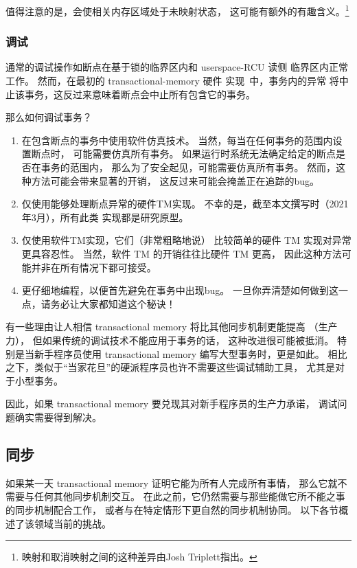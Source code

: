 值得注意的是，会使相关内存区域处于未映射状态，
这可能有额外的有趣含义。\footnote{
	映射和取消映射之间的这种差异由Josh Triplett指出。}

\subsubsection{调试}
\label{sec:future:Debugging}

通常的调试操作如断点在基于锁的临界区内和 userspace-RCU 读侧
临界区内正常工作。
然而，在最初的 transactional-memory 硬件
实现~\cite{DaveDice2009ASPLOSRockHTM}中，事务内的异常
将中止该事务，这反过来意味着断点会中止所有包含它的事务。

那么如何调试事务？

\begin{enumerate}
\item	在包含断点的事务中使用软件仿真技术。
	当然，每当在任何事务的范围内设置断点时，
	可能需要仿真所有事务。
	如果运行时系统无法确定给定的断点是否在事务的范围内，
	那么为了安全起见，可能需要仿真所有事务。
	然而，这种方法可能会带来显著的开销，
	这反过来可能会掩盖正在追踪的bug。
\item	仅使用能够处理断点异常的硬件TM实现。
	不幸的是，截至本文撰写时（2021年3月），所有此类
	实现都是研究原型。
\item	仅使用软件TM实现，它们（非常粗略地说）
	比较简单的硬件 TM 实现对异常更具容忍性。
	当然，软件 TM 的开销往往比硬件 TM 更高，
	因此这种方法可能并非在所有情况下都可接受。
\item	更仔细地编程，以便首先避免在事务中出现bug。
	一旦你弄清楚如何做到这一点，请务必让大家都知道这个秘诀！
\end{enumerate}

有一些理由让人相信 transactional memory 将比其他同步机制更能提高
（生产力），
但如果传统的调试技术不能应用于事务的话，
这种改进很可能被抵消。
特别是当新手程序员使用 transactional memory 编写大型事务时，更是如此。
相比之下，类似于``当家花旦''的硬派程序员也许不需要这些调试辅助工具，
尤其是对于小型事务。

因此，如果 transactional memory 要兑现其对新手程序员的生产力承诺，
调试问题确实需要得到解决。

\subsection{同步}
\label{sec:future:Synchronization}

如果某一天 transactional memory 证明它能为所有人完成所有事情，
那么它就不需要与任何其他同步机制交互。
在此之前，它仍然需要与那些能做它所不能之事的同步机制配合工作，
或者与在特定情形下更自然的同步机制协同。
以下各节概述了该领域当前的挑战。

